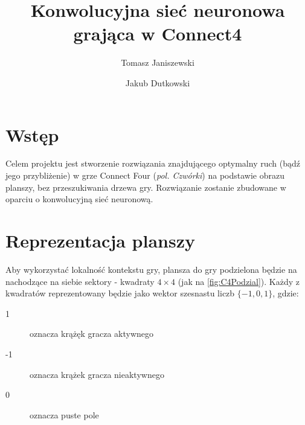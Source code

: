 \documentclass{llncs}
\begin{document}
\title{Konwolucyjna sieć neuronowa grająca w Connect4}
%
%
\author{Tomasz Janiszewski \and Jakub Dutkowski}
%
%


\maketitle              %

%
\section{Wstęp}
Celem projektu jest stworzenie rozwiązania znajdującego optymalny ruch (bądź jego przybliżenie) w grze Connect Four (\emph{pol. Czwórki}) \cite{connect4:wiki} na podstawie obrazu planszy, bez przeszukiwania drzewa gry. 
Rozwiązanie zostanie zbudowane w oparciu o konwolucyjną sieć neuronową.

\section{Reprezentacja planszy}
Aby wykorzystać lokalność kontekstu gry, plansza do gry podzielona będzie na nachodzące na siebie sektory - kwadraty $4 \times 4$ (jak na \autoref{fig:C4Podzial}). 
Każdy z kwadratów reprezentowany będzie jako wektor szesnastu liczb $\{-1, 0, 1\}$, gdzie:
\begin{description}
	\item[1] oznacza krążęk gracza aktywnego
	\item[-1] oznacza krążek gracza nieaktywnego
	\item[0] oznacza puste pole
\end{description} 
\end{document}
